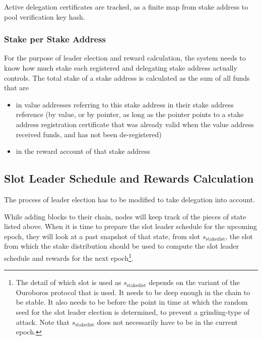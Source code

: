\documentclass[11pt,a4paper,dvipsnames,twosided]{article}
\begin{document}
Active delegation certificates are tracked, as a finite map from stake address
to pool verification key hash.

\subsubsection{Stake per Stake Address}
\label{stake-per-staking-key}

For the purpose of leader election and reward calculation, the system needs to
know how much stake each registered and delegating stake address actually
controls. The total stake of a stake address is calculated as the sum of all
funds that are
\begin{itemize}
\item in value addresses referring to this stake address in their stake
  address reference (by value, or by pointer, as long as the pointer points to a
  stake address registration certificate that was already valid when the value
  address received funds, and has not been de-registered)
\item in the reward account of that stake address
\end{itemize}

\subsection{Slot Leader Schedule and Rewards Calculation}
\label{slot-leader-schedule}

The process of leader election has to be modified to take delegation
into account.

While adding blocks to their chain, nodes will keep track of the
pieces of state listed above. When it is time to prepare the slot
leader schedule for the upcoming epoch, they will look at a past
snapshot of that state, from slot \(s_\text{stakedist}\), the slot
from which the stake distribution should be used to compute the slot
leader schedule and rewards for the next epoch\footnote{The detail of
  which slot is used as \(s_\text{stakedist}\) depends on the variant
  of the Ouroboros protocol that is used. It needs to be deep enough
  in the chain to be stable. It also needs to be before the point in
  time at which the random seed for the slot leader election is
  determined, to prevent a grinding-type of attack. Note that
  \(s_\text{stakedist}\) does not necessarily have to be in the
  current epoch.}.
\end{document}
